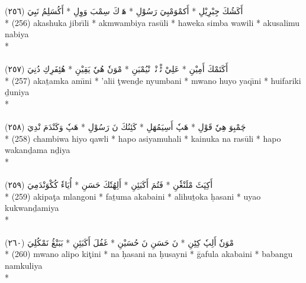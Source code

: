 \documentclass[a4paper, 12pt]{report}
\begin{document}
\begin{center}
\textarabic{(٢٥٦) \textcolor{mygreen}{أَكَشُكَ جِبْرِيْلِ  * أَكمْوَمْبِيَ رَسُوْلِ  * هَوٖكَ سِمْبَ وَوِلِ  * أَكُسَلِمُ نَبِيَ }} \\* 
(256) akashuka jibrı̄li  * akmwambiya rasūli  * haweka simba wawili  * akusalimu nabiya  \\* 
 \\ 
\\[8mm] 

\textarabic{(٢٥٧) \textcolor{mygreen}{أَكَتَمْكَ أَمِيْنِ  * عَلِيْ ٹْوٖنْدٖ نْيُمْبَنِ  * مْوَنٗ هُيٗ يَقِيْنِ  * هُئِفَرِكِ دُنِيَ }} \\* 
(257) akaṯamka amı̄ni  * 'alii ţwenḏe nyumbani  * mwano huyo yaqı̄ni  * huifariki ḏuniya  \\* 
 \\ 
\\[8mm] 

\textarabic{(٢٥٨) \textcolor{mygreen}{چَمْبِوَ هِيٗ قَوْلِ  * هَپٗ أَسِيَمُهَلِ  * كَئِنُكَ نَ رَسُوْلِ  * هَپٗ وَكَنْدَمَ نْدِيَ }} \\* 
(258) chambiwa hiyo qawli  * hapo asiyamuhali  * kainuka na rasūli  * hapo wakanḏama nḏiya  \\* 
 \\ 
\\[8mm] 

\textarabic{(٢٥٩) \textcolor{mygreen}{أَكِپَٹَ مْلَنْڠٗنِ  * فَتُمَ أَكَبَئِنِ  * أَلِهُتٗكَ حَسَنِ  * أُيَاءٗ كُكْوَنْدَمِيَ }} \\* 
(259) akipaţa mlangoni  * faṯuma akabaini  * alihuṯoka ḥasani  * uyao kukwanḏamiya  \\* 
 \\ 
\\[8mm] 

\textarabic{(٢٦٠) \textcolor{mygreen}{مْوَنٗ أَلِپٗ كِٹِنِ  * نَ حَسَنِ نَ حُسَيْنِ  * غَفُلَ أَكَبَئِنِ  * بَبَنْڠُ نَمْكُلِيَ }} \\* 
(260) mwano alipo kiţini  * na ḥasani na ḥusayni  * ḡafula akabaini  * babangu namkuliya  \\* 
 \\ 
\\[8mm] 


\end{center}
\end{document}

